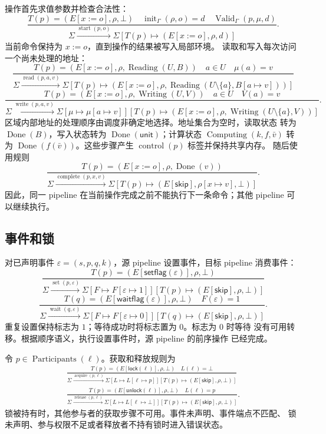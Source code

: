 \documentclass[UTF8,a4paper,11pt,fontset=fandol]{ctexart}
\newcommand{\kw}[1]{\mathsf{#1}}
\newcommand{\step}[1]{\xrightarrow{#1}}
\newcommand{\Read}{\operatorname{Reading}}
\newcommand{\Write}{\operatorname{Writing}}
\newcommand{\Compute}{\operatorname{Computing}}
\newcommand{\Done}{\operatorname{Done}}
\begin{document}
操作首先求值参数并检查合法性：
\[
\frac{T(p)=(E[x:=o],\rho,\bot)\quad
 \operatorname{init}_\Gamma(\rho,o)=d\quad
 \operatorname{Valid}_\Gamma(p,\mu,d)}
 {\Sigma\step{\operatorname{start}(p,o)}
  \Sigma[T(p)\mapsto(E[x:=o],\rho,d)]}.
\]
当前命令保持为 $x:=o$，直到操作的结果被写入局部环境。
读取和写入每次访问一个尚未处理的地址：
\[
\frac{T(p)=(E[x:=o],\rho,\Read(U,B))\quad a\in U\quad\mu(a)=v}
 {\Sigma\step{\operatorname{read}(p,a,v)}
  \Sigma[T(p)\mapsto(E[x:=o],\rho,\Read(U\setminus\{a\},B[a\mapsto v]))]}
\]
\[
\frac{T(p)=(E[x:=o],\rho,\Write(U,V))\quad a\in U\quad V(a)=v}
 {\Sigma\step{\operatorname{write}(p,a,v)}
  \Sigma[\mu\mapsto\mu[a\mapsto v]]
        [T(p)\mapsto(E[x:=o],\rho,\Write(U\setminus\{a\},V))]}.
\]
区域内部地址的处理顺序由调度非确定地选择。地址集合为空时，读取状态
转为 $\Done(B)$，写入状态转为 $\Done(\kw{unit})$；计算状态
$\Compute(k,f,\bar v)$ 转为 $\Done(f(\bar v))$。这些步骤产生
$\operatorname{control}(p)$ 标签并保持共享内存。
随后使用规则
\[
\frac{T(p)=(E[x:=o],\rho,\Done(v))}
 {\Sigma\step{\operatorname{complete}(p,x,v)}
  \Sigma[T(p)\mapsto(E[\kw{skip}],\rho[x\mapsto v],\bot)]}.
\]
因此，同一 pipeline 在当前操作完成之前不能执行下一条命令；其他
pipeline 可以继续执行。

\subsection{事件和锁}

对已声明事件 $\varepsilon=(s,p,q,k)$，源 pipeline 设置事件，目标
pipeline 消费事件：
\[
\frac{T(p)=(E[\kw{setflag}(\varepsilon)],\rho,\bot)}
 {\Sigma\step{\operatorname{set}(p,\varepsilon)}
  \Sigma[F\mapsto F[\varepsilon\mapsto1]]
        [T(p)\mapsto(E[\kw{skip}],\rho,\bot)]}
\]
\[
\frac{T(q)=(E[\kw{waitflag}(\varepsilon)],\rho,\bot)\quad F(\varepsilon)=1}
 {\Sigma\step{\operatorname{wait}(q,\varepsilon)}
  \Sigma[F\mapsto F[\varepsilon\mapsto0]]
        [T(q)\mapsto(E[\kw{skip}],\rho,\bot)]}.
\]
重复设置保持标志为 $1$；等待成功时将标志置为 $0$。标志为 $0$ 时等待
没有可用转移。根据顺序语义，执行设置事件时，源 pipeline 的前序操作
已经完成。

令 $p\in\operatorname{Participants}(\ell)$。获取和释放规则为
\begin{gather*}
\frac{T(p)=(E[\kw{lock}(\ell)],\rho,\bot)\quad L(\ell)=\bot}
 {\Sigma\step{\operatorname{acquire}(p,\ell)}
  \Sigma[L\mapsto L[\ell\mapsto p]]
        [T(p)\mapsto(E[\kw{skip}],\rho,\bot)]}\\[1em]
\frac{T(p)=(E[\kw{unlock}(\ell)],\rho,\bot)\quad L(\ell)=p}
 {\Sigma\step{\operatorname{release}(p,\ell)}
  \Sigma[L\mapsto L[\ell\mapsto\bot]]
        [T(p)\mapsto(E[\kw{skip}],\rho,\bot)]}.
\end{gather*}
锁被持有时，其他参与者的获取步骤不可用。事件未声明、事件端点不匹配、
锁未声明、参与权限不足或者释放者不持有锁时进入错误状态。
\end{document}
